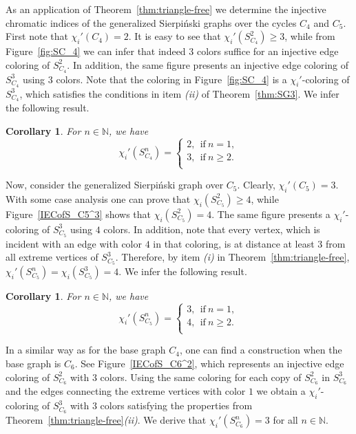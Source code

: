 \documentclass{article}
\newtheorem{corollary}[theorem]{Corollary}
\begin{document}
As an application of Theorem~\ref{thm:triangle-free} we determine the injective chromatic indices of the generalized Sierpi\'{n}ski graphs over the cycles $C_4$ and $C_5$. 
First note that $\chi_i'(C_4)=2$. It is easy to see that $\chi_i'(S^2_{C_4})\ge 3$, while from Figure~\ref{fig:SC_4} we can infer that indeed $3$ colors suffice for an injective edge coloring of $S^2_{C_4}$. In addition, the same figure presents an injective edge coloring of $S^3_{C_4}$ using $3$ colors.  Note that the coloring in Figure~\ref{fig:SC_4} is a $\chi_i'$-coloring of $S_{C_4}^3$, which satisfies the conditions in item {\it (ii)} of Theorem~\ref{thm:SG3}. We infer the following result.

\begin{corollary}
For $n\in \mathbb{N}$, we have
$$\chi_i'(S_{C_4}^n)= \begin{cases}
	           2, ~~\textrm{if}~ n=1,\\
	           3, ~~\textrm{if}~ n\ge 2.\\
	          \end{cases}$$
\end{corollary}



Now, consider the generalized Sierpi\'{n}ski graph over $C_5$. Clearly, $\chi_i'(C_5)=3$. With some case analysis one can prove that $\chi_i(S_{C_5}^2)\ge 4$, while Figure~\ref{IECofS_C5^3} shows that $\chi_i(S_{C_5}^2)=4$. The same figure presents a $\chi_i'$-coloring of $S_{C_5}^3$ using $4$ colors. In addition, note that every vertex, which is incident with an edge with color $4$ in that coloring, is at distance at least $3$ from all extreme vertices of $S_{C_5}^3$. Therefore, by item \textit{(i)} in Theorem~\ref{thm:triangle-free}, $\chi_i'(S_{C_5}^n)=\chi_i(S_{C_5}^3)=4$. We infer the following result.  
\begin{corollary}
For $n\in \mathbb{N}$, we have
$$\chi_i'(S_{C_5}^n)= \begin{cases}
	           3, ~~\textrm{if}~ n=1,\\
	           4, ~~\textrm{if}~ n\ge 2.\\
	          \end{cases}$$
\end{corollary}

In a similar way as for the base graph $C_4$, one can find a construction when the base graph is $C_6$. See Figure~\ref{IECofS_C6^2}, which represents an injective edge coloring of $S_{C_6}^2$ with $3$ colors. Using the same coloring for each copy of $S_{C_6}^2$ in $S_{C_6}^3$ and the edges connecting the extreme vertices with color $1$ we obtain a $\chi_i'$-coloring of $S_{C_6}^3$ with $3$ colors satisfying the properties from Theorem~\ref{thm:triangle-free}{\it (ii)}. We derive that $\chi_i'(S_{C_6}^n)=3$ for all $n\in \mathbb{N}$.  
\end{document}
